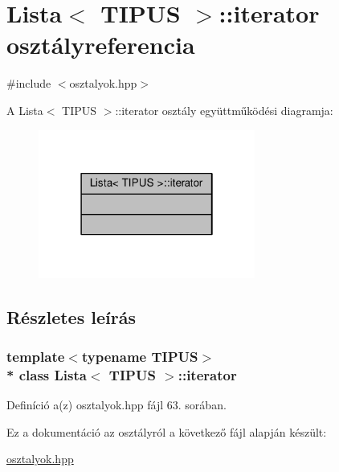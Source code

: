 \hypertarget{classLista_1_1iterator}{}\section{Lista$<$ T\+I\+P\+US $>$\+:\+:iterator osztályreferencia}
\label{classLista_1_1iterator}


{\ttfamily \#include $<$osztalyok.\+hpp$>$}



A Lista$<$ T\+I\+P\+US $>$\+:\+:iterator osztály együttműködési diagramja\+:\nopagebreak
\begin{figure}[H]
\begin{center}
\leavevmode
\includegraphics[width=202pt]{classLista_1_1iterator__coll__graph}
\end{center}
\end{figure}


\subsection{Részletes leírás}
\subsubsection*{template$<$typename T\+I\+P\+US$>$\\*
class Lista$<$ T\+I\+P\+U\+S $>$\+::iterator}



Definíció a(z) osztalyok.\+hpp fájl 63. sorában.



Ez a dokumentáció az osztályról a következő fájl alapján készült\+:\begin{DoxyCompactItemize}
\item 
\hyperlink{osztalyok_8hpp}{osztalyok.\+hpp}\end{DoxyCompactItemize}
